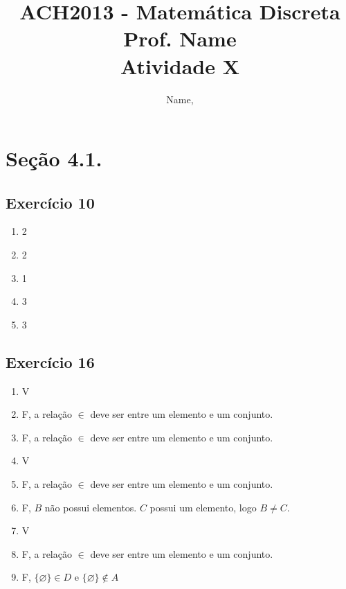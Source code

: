 \documentclass[12pt,a4paper]{article}
\begin{document}
\author{Name,  }
\title{ACH2013 - Matemática Discreta \\
\large Prof. Name \\
\large Atividade X}
\maketitle

\section*{Seção 4.1.}
\subsection*{Exercício 10}
\begin{enumerate}[label=\textbf{\alph*.}]
\item 2 
\item 2
\item 1
\item 3
\item 3
\end{enumerate}
\subsection*{Exercício 16}
\begin{enumerate}[label=\textbf{\alph*.}]
\item V
\item F, \quad a relação $\in$ deve ser entre um elemento e um conjunto.
\item F, \quad a relação $\in$ deve ser entre um elemento e um conjunto.
\item V
\item F, \quad a relação $\in$ deve ser entre um elemento e um conjunto.
\item F, \quad $B$ não possui elementos. $C$ possui um elemento, logo $B \neq C$.
\item V
\item F, \quad a relação $\in$ deve ser entre um elemento e um conjunto.
\item F, \quad $\{{\varnothing}\} \in D$ e $\{{\varnothing}\} \not\in A$
\end{enumerate}
\end{document}
